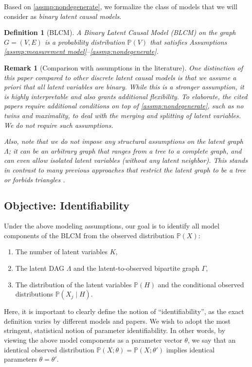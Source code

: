 \documentclass[10pt]{article} %
\newtheorem{definition}{Definition}
\newtheorem{remark}{Remark}
\newcommand{\PP}{\mathbb P}
\begin{document}
Based on \cref{assmp:nondegenerate}, we formalize the class of models that we will consider as \emph{binary latent causal models}.
\begin{definition}[BLCM]\label{def:blcm}
    A Binary Latent Causal Model (BLCM) on the graph $G = (V, E)$ is a probability distribution $\PP(V)$ that satisfies Assumptions \ref{assmp:measurement model}--\ref{assmp:nondegenerate}. %
\end{definition}

\begin{remark}[Comparison with assumptions in the literature]
    One distinction of this paper compared to other discrete latent causal models \citep{kivva2021learning, chen2024learning, kong2024learning} is that we assume a priori that all latent variables are \emph{binary}. While this is a stronger assumption, it is highly interpretable and also grants additional flexibility. To elaborate, the cited papers require additional conditions on top of \cref{assmp:nondegenerate}, such as no twins and maximality, to deal with the merging and splitting of latent variables. We do not require such assumptions. 

    Also, note that we do not impose any structural assumptions on the latent graph $\Lambda$; it can be an arbitrary graph that ranges from a tree to a complete graph, and can even allow isolated latent variables (without any latent neighbor). This stands in contrast to many previous approaches that restrict the latent graph to be a tree \citep{pearl1986structuring, choi2011learning} or forbids triangles \citep{kong2024learning}.
\end{remark}



\subsection{Objective: Identifiability}\label{sec:objective} 
Under the above modeling assumptions, our goal is to identify all model components of the BLCM from the observed distribution $\PP(X)$:
\begin{enumerate}[1.]
    \item The number of latent variables $K$,
    \item The latent DAG $\Lambda$ and the latent-to-observed bipartite graph $\Gamma$,
    \item The distribution of the latent variables $\PP(H)$ and the conditional observed distributions $\PP(X_j \mid H)$.
\end{enumerate}
Here, it is important to clearly define the notion of ``identifiability'', as the exact definition varies by different models and papers. We wish to adopt the most stringent, statistical notion of parameter identifiability. In other words, by viewing the above model components as a parameter vector $\theta$, we say that an identical observed distribution $\PP(X; \theta) = \PP(X; \theta')$ implies identical parameters $\theta = \theta'$.
\end{document}
